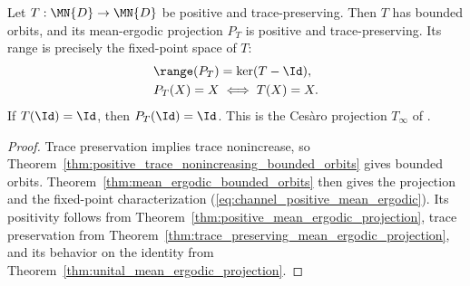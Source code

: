 \begin{theorem}
    \label{thm:positive_trace_preserving_mean_ergodic_projection}
    \leanok
    Let $T:\MN{D}\to\MN{D}$ be positive and trace-preserving. Then $T$ has
    bounded orbits, and its mean-ergodic projection $P_T$ is positive and
    trace-preserving. Its range is precisely the fixed-point space of $T$:
    \begin{align}
        \range(P_T) & =\ker(T-\Id), \notag \\
        P_T(X)=X    & \iff T(X)=X.
        \label{eq:channel_positive_mean_ergodic}
    \end{align}
    If $T(\Id)=\Id$, then $P_T(\Id)=\Id$.
    This is the Ces\`aro projection $T_\infty$ of
    \cite[Proposition~6.3 and Equation~(6.14)]{Wolf2012Quantum}.
\end{theorem}

\begin{proof}\leanok
    Trace preservation implies trace nonincrease, so
    Theorem~\ref{thm:positive_trace_nonincreasing_bounded_orbits} gives
    bounded orbits. Theorem~\ref{thm:mean_ergodic_bounded_orbits} then gives
    the projection and the fixed-point characterization
    (\ref{eq:channel_positive_mean_ergodic}). Its positivity follows from
    Theorem~\ref{thm:positive_mean_ergodic_projection}, trace preservation
    from Theorem~\ref{thm:trace_preserving_mean_ergodic_projection}, and its
    behavior on the identity from
    Theorem~\ref{thm:unital_mean_ergodic_projection}.
\end{proof}

